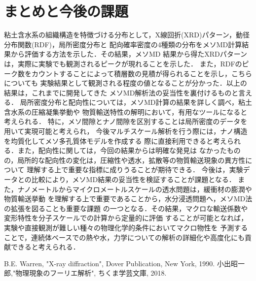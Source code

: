 ﻿\documentclass[11pt,a4j]{jarticle}
\begin{document}
\section{まとめと今後の課題}
粘土含水系の組織構造を特徴づける分布として，X線回折(XRD)パターン，動径分布関数(RDF)，局所密度分布と
配向確率密度の4種類の分布をメソMD計算結果から評価する方法を示した．その結果，メソMD
結果から得たXRDパターンは，実際に実験でも観測されるピークが現れることを示した．
また，RDFのピーク数をカウントすることによって積層数の見積が得られることを示し，こちらについても
実験結果として観測される程度の値となることが分かった．以上の結果は，これまでに開発してきた
メソMD解析法の妥当性を裏付けるものと言える．
局所密度分布と配向性については，メソMD計算の結果を詳しく調べ，粘土含水系の圧縮凝集挙動や
物質輸送特性の解明において，有用なツールになると考えられる．
特に，メソ間隙とナノ間隙を区別することは局所密度のデータを用いて実現可能と考えられ，
今後マルチスケール解析を行う際には，ナノ構造を均質化してメソ多孔質体モデルを作成する
際に直接利用できると考えられる．また，配向性に関しては，今回の結果からは明確な発見は
なかったものの，局所的な配向性の変化は，圧縮性や透水，拡散等の物質輸送現象の異方性について
理解する上で重要な指標に成りうることが期待できる．
今後は，実験データとの比較により，メソMD結果の妥当性を検証することが課題となる．
また，ナノメートルからマイクロメートルスケールの透水問題は，緩衝材の膨潤や物質輸送挙動
を理解する上で重要であることから，水分浸透問題へ，メソMD法の拡張を図ることも重要な課題
の一つとなる．その結果，マクロな輸送係数や変形特性を分子スケールでの計算から定量的に評価
することが可能となれば，実験や直接観測が難しい種々の物理化学的条件においてマクロ物性を
予測することで，連続体ベースでの熱や水，力学についての解析の詳細化や高度化にも貢献できると考えられる．
\begin{thebibliography}{99}
	B.E. Warren, "X-ray diffraction", Dover Publication, New York, 1990.
	小出昭一郎,"物理現象のフーリエ解析", ちくま学芸文庫, 2018.
\end{thebibliography}
\end{document}
